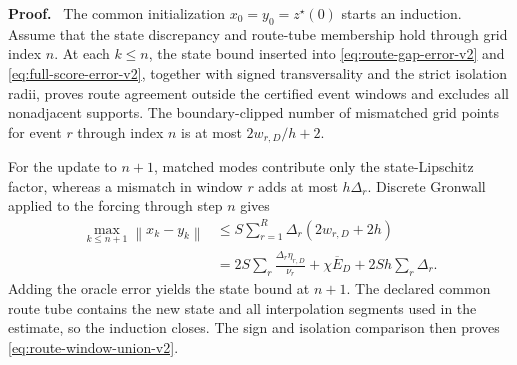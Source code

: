 \documentclass[twoside,11pt]{article}
\renewenvironment{proof}[1][Proof]{\par\noindent\textbf{#1.}\ }{\hfill\BlackBox\par\medskip}
\newcommand{\norm}[1]{\left\lVert #1\right\rVert}
\begin{document}
\begin{proof}
The common initialization $x_0=y_0=z^\star(0)$ starts an induction.  Assume
that the state discrepancy and route-tube membership hold through grid index
$n$.  At each $k\le n$, the state bound inserted into
\eqref{eq:route-gap-error-v2} and \eqref{eq:full-score-error-v2}, together
with signed transversality and the strict isolation radii, proves route
agreement outside the certified event windows and excludes all nonadjacent
supports.  The boundary-clipped number of mismatched grid points for event
$r$ through index $n$ is at most $2w_{r,D}/h+2$.

For the update to $n+1$, matched modes contribute only the state-Lipschitz
factor, whereas a mismatch in window $r$ adds at most $h\Delta_r$.  Discrete
Gronwall applied to the forcing through step $n$ gives
\begin{align}
 \max_{k\le n+1}\norm{x_k-y_k}
 &\le S\sum_{r=1}^R\Delta_r(2w_{r,D}+2h)\\
 &=2S\sum_r\frac{\Delta_r\eta_{r,D}}{\nu_r}
   +\chi\overline E_D+2Sh\sum_r\Delta_r.
 \label{eq:route-gronwall-v2}
\end{align}
Adding the oracle error yields the state bound at $n+1$.  The declared common
route tube contains the new state and all interpolation segments used in the
estimate, so the induction closes.  The sign and isolation comparison then
proves \eqref{eq:route-window-union-v2}.
\end{proof}

\end{document}
